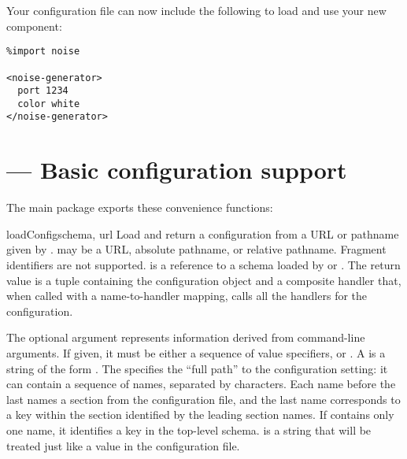 \documentclass{howto}
\begin{document}
Your configuration file can now include the following to load and use
your new component:

\begin{verbatim}
%import noise

<noise-generator>
  port 1234
  color white
</noise-generator>
\end{verbatim}


\section{ --- Basic configuration support}


The main  package exports these convenience functions:

\begin{funcdesc}{loadConfig}{schema, url}
  Load and return a configuration from a URL or pathname given by
  .   may be a URL, absolute pathname, or relative
  pathname.  Fragment identifiers are not supported.   is
  a reference to a schema loaded by  or
  .
  The return value is a tuple containing the configuration object and
  a composite handler that, when called with a name-to-handler
  mapping, calls all the handlers for the configuration.

  The optional  argument represents information derived
  from command-line arguments.  If given, it must be either a sequence
  of value specifiers, or .  A  is a
  string of the form .  The
   specifies the ``full path'' to the configuration
  setting: it can contain a sequence of names, separated by
  \character{/} characters. Each name before the last names a section
  from the configuration file, and the last name corresponds to a key
  within the section identified by the leading section names.  If
   contains only one name, it identifies a key in the
  top-level schema.   is a string that will be treated
  just like a value in the configuration file.
\end{funcdesc}
\end{document}
